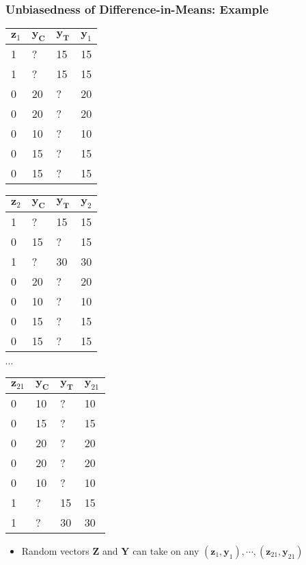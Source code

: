 \documentclass[table, xcolor = {dvipsnames}, 9pt]{beamer}
\theoremstyle{plain}
\begin{document}
\begin{frame}
\frametitle{Unbiasedness of Difference-in-Means: Example}
\begin{table}[H]
\scriptsize
    \begin{tabular}{l|l|l|l|}
    $\bm{z}_1$ & $\bm{y_C}$ & $\bm{y_T}$ & $\bm{y}_1$ \\ \midrule
    1 & ?  & 15  & 15 \\
    1 & ?  & 15  & 15 \\
    0 & 20 & ?   & 20 \\
    0 & 20 & ?   & 20 \\
    0 & 10 & ?   & 10 \\
    0 & 15 & ?   & 15 \\
    0 & 15 & ?   & 15 \\
    \end{tabular}
    \hfill
      \begin{tabular}{l|l|l|l|}
    $\bm{z}_2$ & $\bm{y_C}$ & $\bm{y_T}$ & $\bm{y}_2$ \\ \midrule
    1 &  ? & 15 & 15 \\
    0 & 15 & ?  & 15 \\
    1 & ?  & 30 & 30 \\
    0 & 20 & ?  & 20 \\
    0 & 10 & ?  & 10 \\
    0 & 15 & ?  & 15 \\
    0 & 15 & ?  & 15 \\
    \end{tabular}
     \hfill
     $\cdots $
     \hfill
      \begin{tabular}{l|l|l|l|}
    $\bm{z}_{21}$ & $\bm{y_C}$ & $\bm{y_T}$ & $\bm{y}_{21}$ \\ \midrule
    0 & 10 & ?  & 10 \\
    0 & 15 & ?  & 15 \\
    0 & 20 & ?  & 20 \\
    0 & 20 & ?  & 20 \\
    0 & 10 & ?  & 10 \\
    1 & ?  & 15 & 15 \\
    1 & ?  & 30 & 30 \\
    \end{tabular}
\end{table} 
\begin{itemize}
\item Random vectors $\bm{Z}$ and $\bm{Y}$ can take on any $\left(\bm{z}_1, \bm{y}_1\right), \cdots , \left(\bm{z}_{21}, \bm{y}_{21}\right)$  \vspace{1em} \pause

\end{itemize}
\end{frame}
\end{document}
